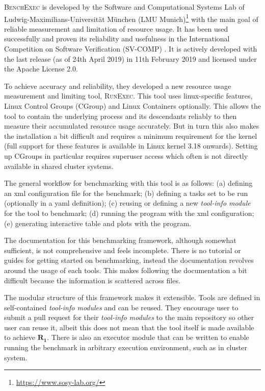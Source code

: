 \textsc{BenchExec} \citep{philipp_wendler_2019_2561835} is developed by the Software and Computational Systems Lab of Ludwig-Maximilians-Universität München (LMU Munich)\footnote{\href{https://www.sosy-lab.org/}{https://www.sosy-lab.org/}} with the main goal of reliable measurement and limitation of resource usage.
It has been used successfully and proven its reliability and usefulness in the International Competition on Software Verification (SV-COMP) \citep{beyerReliableBenchmarkingRequirements2019}.
It is actively developed with the last release (as of 24th April 2019) in 11th February 2019 and licensed under the Apache License 2.0.

To achieve accuracy and reliability, they developed a new resource usage measurement and limiting tool, \textsc{RunExec}.
This tool uses linux-specific features, Linux Control Groups (CGroup) and Linux Containers optionally.
This allows the tool to contain the underlying process and its descendants reliably to then measure their accumulated resource usage accurately.
But in turn this also makes the installation a bit difficult and requires a minimum requirement for the kernel (full support for these features is available in Linux kernel 3.18 onwards).
Setting up CGroups in particular requires superuser access which often is not directly available in shared cluster systems.

The general workflow for benchmarking with this tool is as follows:
(a) defining an xml configuration file for the benchmark;
(b) defining a tasks set to be run (optionally in a yaml definition);
(c) reusing or defining a new \textit{tool-info module} for the tool to benchmark;
(d) running the  program with the xml configuration;
(e) generating interactive table and plots with the  program.

The documentation for this benchmarking framework, although somewhat sufficient, is not comprehensive and feels incomplete.
There is no tutorial or guides for getting started on benchmarking, instead the documentation revolves around the usage of each tools.
This makes following the documentation a bit difficult because the information is scattered across files.

The modular structure of this framework makes it extensible.
Tools are defined in self-contained \textit{tool-info modules} and can be reused.
They encourage user to submit a pull request for their \textit{tool-info modules} to the main repository so other user can reuse it, albeit this does not mean that the tool itself is made available to achieve $\bm{R_1}$.
There is also an executor module that can be written to enable running the benchmark in arbitrary execution environment, such as in cluster system.

